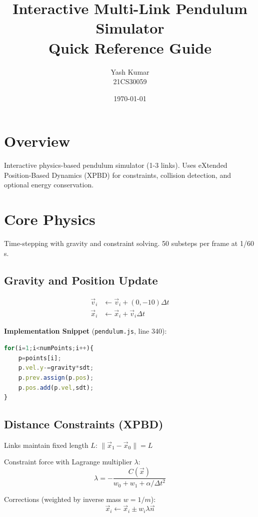 \documentclass[12pt,a4paper]{article}
\title{\textbf{Interactive Multi-Link Pendulum Simulator}\\
\large Quick Reference Guide}
\author{Yash Kumar \\ 21CS30059}
\date{\today}
\begin{document}
\maketitle

\tableofcontents
\newpage

\section{Overview}

Interactive physics-based pendulum simulator (1-3 links). Uses eXtended Position-Based Dynamics (XPBD) for constraints, collision detection, and optional energy conservation.

\section{Core Physics}

Time-stepping with gravity and constraint solving. 50 substeps per frame at 1/60 s.

\subsection{Gravity and Position Update}

\begin{align}
\vec{v}_i &\leftarrow \vec{v}_i + (0, -10) \Delta t \\
\vec{x}_i &\leftarrow \vec{x}_i + \vec{v}_i \Delta t
\end{align}

\noindent\textbf{Implementation Snippet} (\texttt{pendulum.js}, line 340):
\begin{lstlisting}[language=JavaScript]
for(i=1;i<numPoints;i++){
    p=points[i];
    p.vel.y-=gravity*sdt;
    p.prev.assign(p.pos);
    p.pos.add(p.vel,sdt);
}
\end{lstlisting}

\subsection{Distance Constraints (XPBD)}

Links maintain fixed length $L$: \quad $\|\vec{x}_1 - \vec{x}_0\| = L$

Constraint force with Lagrange multiplier $\lambda$:
\begin{equation}
\lambda = -\frac{C(\vec{x})}{w_0 + w_1 + \alpha/\Delta t^2}
\end{equation}

Corrections (weighted by inverse mass $w=1/m$):
\begin{equation}
\vec{x}_i \leftarrow \vec{x}_i \pm w_i \lambda \vec{n}
\end{equation}
\end{document}
